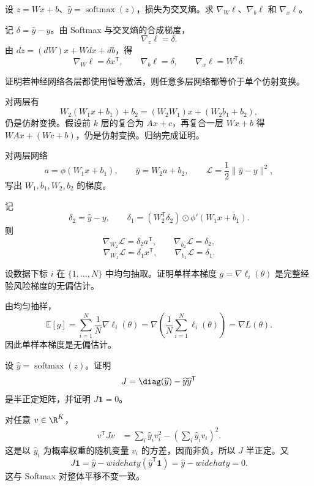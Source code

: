 \begin{exercise}[level=standard]
设 $z=Wx+b$、$\widehat y=\operatorname{softmax}(z)$，损失为交叉熵。求 $\nabla_W\ell$、$\nabla_b\ell$ 和 $\nabla_x\ell$。
\begin{solution}
记 $\delta=\widehat y-y$。由 Softmax 与交叉熵的合成梯度，
\[
\nabla_z\ell=\delta.
\]
由 $dz=(dW)x+Wdx+db$，得
\[
\nabla_W\ell=\delta x^{\mathsf T},
\qquad
\nabla_b\ell=\delta,
\qquad
\nabla_x\ell=W^{\mathsf T}\delta.
\]
\end{solution}
\end{exercise}

\begin{exercise}[level=standard]
证明若神经网络各层都使用恒等激活，则任意多层网络都等价于单个仿射变换。
\begin{solution}
对两层有
\[
W_2(W_1x+b_1)+b_2
=(W_2W_1)x+(W_2b_1+b_2),
\]
仍是仿射变换。假设前 $k$ 层的复合为 $Ax+c$，再复合一层 $Wx+b$ 得
$WAx+(Wc+b)$，仍是仿射变换。归纳完成证明。
\end{solution}
\end{exercise}

\begin{exercise}[level=standard]
对两层网络
\[
a=\phi(W_1x+b_1),
\qquad
\widehat y=W_2a+b_2,
\qquad
\mathcal L=\frac12\lVert\widehat y-y\rVert^2,
\]
写出 $W_1,b_1,W_2,b_2$ 的梯度。
\begin{solution}
记
\[
\delta_2=\widehat y-y,
\qquad
\delta_1=(W_2^{\mathsf T}\delta_2)\odot\phi'(W_1x+b_1).
\]
则
\[
\nabla_{W_2}\mathcal L=\delta_2a^{\mathsf T},
\qquad
\nabla_{b_2}\mathcal L=\delta_2,
\]
\[
\nabla_{W_1}\mathcal L=\delta_1x^{\mathsf T},
\qquad
\nabla_{b_1}\mathcal L=\delta_1.
\]
\end{solution}
\end{exercise}

\begin{exercise}[level=standard]
设数据下标 $i$ 在 $\{1,\ldots,N\}$ 中均匀抽取。证明单样本梯度 $g=\nabla\ell_i(\theta)$ 是完整经验风险梯度的无偏估计。
\begin{solution}
由均匀抽样，
\[
\mathbb E[g]
=\sum_{i=1}^N\frac1N\nabla\ell_i(\theta)
=\nabla\left(\frac1N\sum_{i=1}^N\ell_i(\theta)\right)
=\nabla L(\theta).
\]
因此单样本梯度是无偏估计。
\end{solution}
\end{exercise}

\begin{exercise}[level=advanced]
设 $\widehat y=\operatorname{softmax}(z)$。证明
\[
J=\diag(\widehat y)-\widehat y\widehat y^{\mathsf T}
\]
是半正定矩阵，并证明 $J\mathbf1=0$。
\begin{solution}
对任意 $v\in\R^K$，
\begin{align*}
v^{\mathsf T}Jv
&=\sum_i\widehat y_iv_i^2
-\left(\sum_i\widehat y_iv_i\right)^2.
\end{align*}
这是以 $\widehat y_i$ 为概率权重的随机变量 $v_i$ 的方差，因而非负，所以 $J$ 半正定。又
\[
J\mathbf1=\widehat y-widehat y(\widehat y^{\mathsf T}\mathbf1)
=\widehat y-widehat y=0.
\]
这与 Softmax 对整体平移不变一致。
\end{solution}
\end{exercise}

